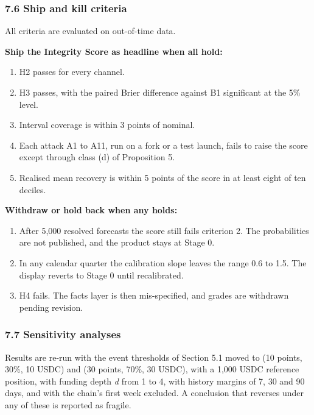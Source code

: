 \subsubsection{7.6 Ship and kill criteria}\label{ship-and-kill-criteria}

All criteria are evaluated on out-of-time data.

\textbf{Ship the Integrity Score as headline when all hold:}

\begin{enumerate}
\def\labelenumi{\arabic{enumi}.}
\tightlist
\item
  H2 passes for every channel.
\item
  H3 passes, with the paired Brier difference against B1 significant at the 5\% level.
\item
  Interval coverage is within 3 points of nominal.
\item
  Each attack A1 to A11, run on a fork or a test launch, fails to raise the score except through class (d) of Proposition 5.
\item
  Realised mean recovery is within 5 points of the score in at least eight of ten deciles.
\end{enumerate}

\textbf{Withdraw or hold back when any holds:}

\begin{enumerate}
\def\labelenumi{\arabic{enumi}.}
\tightlist
\item
  After 5,000 resolved forecasts the score still fails criterion 2. The probabilities are not published, and the product stays at Stage 0.
\item
  In any calendar quarter the calibration slope leaves the range 0.6 to 1.5. The display reverts to Stage 0 until recalibrated.
\item
  H4 fails. The facts layer is then mis-specified, and grades are withdrawn pending revision.
\end{enumerate}

\subsubsection{7.7 Sensitivity analyses}\label{sensitivity-analyses}

Results are re-run with the event thresholds of Section 5.1 moved to (10 points, 30\%, 10 USDC) and (30 points, 70\%, 30 USDC), with a 1,000 USDC reference position, with funding depth \emph{d} from 1 to 4, with history margins of 7, 30 and 90 days, and with the chain's first week excluded. A conclusion that reverses under any of these is reported as fragile.


